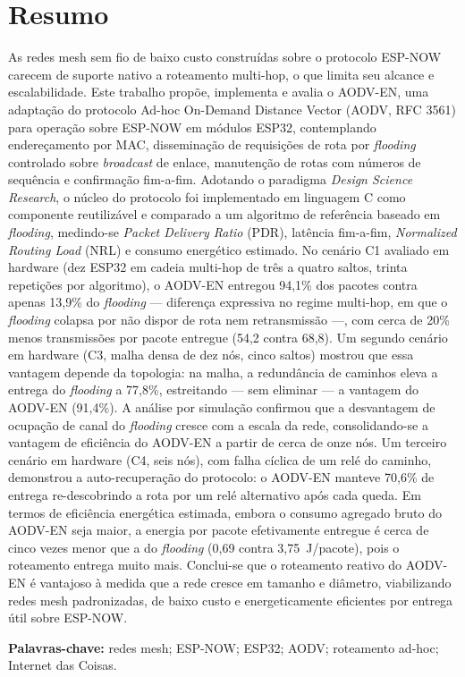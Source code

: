 
\section*{Resumo}

As redes mesh sem fio de baixo custo construídas sobre o protocolo ESP-NOW carecem de
suporte nativo a roteamento multi-hop, o que limita seu alcance e escalabilidade. Este
trabalho propõe, implementa e avalia o AODV-EN, uma adaptação do protocolo Ad-hoc
On-Demand Distance Vector (AODV, RFC 3561) para operação sobre ESP-NOW em módulos ESP32,
contemplando endereçamento por MAC, disseminação de requisições de rota por
\emph{flooding} controlado sobre \emph{broadcast} de enlace, manutenção de rotas com
números de sequência e confirmação fim-a-fim. Adotando o paradigma \emph{Design Science
Research}, o núcleo do protocolo foi implementado em linguagem C como componente
reutilizável e comparado a um algoritmo de referência baseado em \emph{flooding},
medindo-se \emph{Packet Delivery Ratio} (PDR), latência fim-a-fim, \emph{Normalized
Routing Load} (NRL) e consumo energético estimado. No cenário C1 avaliado em hardware
(dez ESP32 em cadeia multi-hop de três a quatro saltos, trinta repetições por
algoritmo), o AODV-EN entregou 94,1\% dos pacotes contra apenas 13,9\% do
\emph{flooding} --- diferença expressiva no regime multi-hop, em que o \emph{flooding}
colapsa por não dispor de rota nem retransmissão ---, com cerca de 20\% menos
transmissões por pacote entregue (54,2 contra 68,8). Um segundo cenário em hardware (C3,
malha densa de dez nós, cinco saltos) mostrou que essa vantagem depende da topologia: na
malha, a redundância de caminhos eleva a entrega do \emph{flooding} a 77,8\%, estreitando
--- sem eliminar --- a vantagem do AODV-EN (91,4\%). A análise por simulação confirmou que
a desvantagem de ocupação de canal do \emph{flooding} cresce com a escala da rede,
consolidando-se a vantagem de eficiência do AODV-EN a partir de cerca de onze nós. Um terceiro cenário em hardware (C4, seis
nós), com falha cíclica de um relé do caminho, demonstrou a auto-recuperação do protocolo:
o AODV-EN manteve 70,6\% de entrega re-descobrindo a rota por um relé alternativo após cada
queda. Em termos de eficiência energética estimada, embora o consumo agregado bruto do
AODV-EN seja maior, a energia por pacote efetivamente entregue é cerca de cinco vezes
menor que a do \emph{flooding} (0,69 contra 3,75~J/pacote), pois o roteamento entrega
muito mais. Conclui-se que o roteamento reativo do AODV-EN é vantajoso à medida que a
rede cresce em tamanho e diâmetro, viabilizando redes mesh padronizadas, de baixo custo
e energeticamente eficientes por entrega útil sobre ESP-NOW.

\vspace{1cm}

\noindent
\textbf{Palavras-chave:} redes mesh; ESP-NOW; ESP32; AODV; roteamento ad-hoc;
Internet das Coisas.
